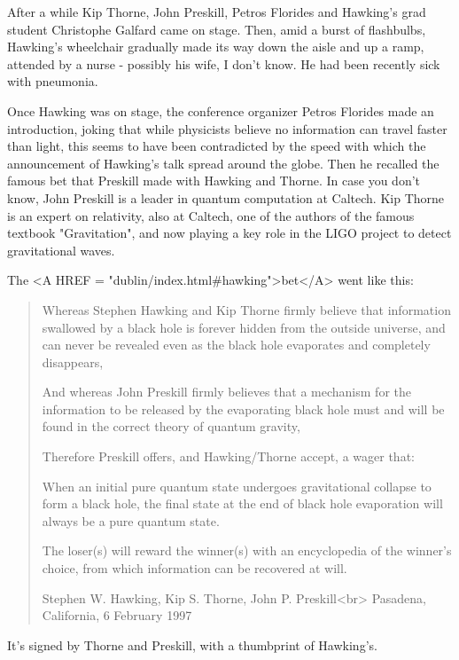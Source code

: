 After a while Kip Thorne, John Preskill, Petros Florides and Hawking's
grad student Christophe Galfard came on stage.  Then, amid a burst of 
flashbulbs, Hawking's wheelchair gradually made its way down the aisle 
and up a ramp, attended by a nurse - possibly his wife, I don't know.  
He had been recently sick with pneumonia.

Once Hawking was on stage, the conference organizer Petros Florides made 
an introduction, joking that while physicists believe no information can
travel faster than light, this seems to have been contradicted by the 
speed with which the announcement of Hawking's talk spread around the globe.  
Then he recalled the famous bet that Preskill made with Hawking and
Thorne.  In case you don't know, John Preskill is a leader in quantum
computation at Caltech.   Kip Thorne is an expert on relativity, also 
at Caltech, one of the authors of the famous textbook "Gravitation", 
and now playing a key role in the LIGO project to detect gravitational 
waves.  

The <A HREF = "dublin/index.html#hawking">bet</A> went like this:

\begin{quote}
     Whereas Stephen Hawking and Kip Thorne firmly believe that 
     information swallowed by a black hole is forever hidden from 
     the outside universe, and can never be revealed even as the 
     black hole evaporates and completely disappears,

     And whereas John Preskill firmly believes that a mechanism 
     for the information to be released by the evaporating black 
     hole must and will be found in the correct theory of quantum 
     gravity,

     Therefore Preskill offers, and Hawking/Thorne accept, a wager that:

     When an initial pure quantum state undergoes gravitational collapse 
     to form a black hole, the final state at the end of black hole 
     evaporation will always be a pure quantum state.

     The loser(s) will reward the winner(s) with an encyclopedia of the 
     winner's choice, from which information can be recovered at will.

     Stephen W. Hawking, Kip S. Thorne, John P. Preskill<br>
     Pasadena, California, 6 February 1997 
\end{quote}

It's signed by Thorne and Preskill, with a thumbprint of Hawking's.

